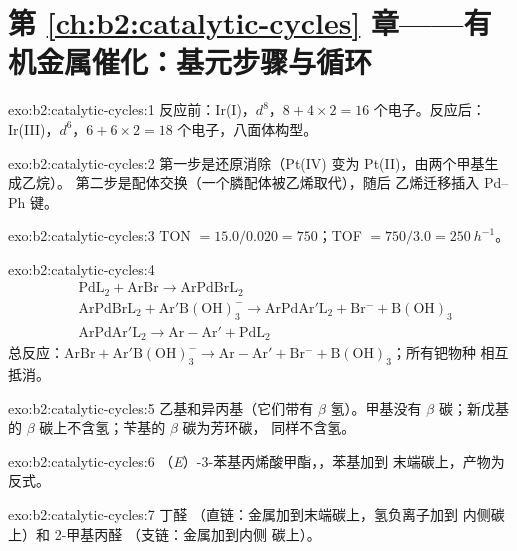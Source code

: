 \section*{第 \ref{ch:b2:catalytic-cycles} 章——有机金属催化：基元步骤与循环}

\begin{solution}{exo:b2:catalytic-cycles:1}
反应前：Ir(I)，$d^8$，$8 + 4 \times 2 = 16$ 个电子。反应后：Ir(III)，$d^6$，$6 + 6 \times 2 = 18$
个电子，八面体构型。
\end{solution}

\begin{solution}{exo:b2:catalytic-cycles:2}
第一步是还原消除（Pt(IV) 变为 Pt(II)，由两个甲基生成乙烷）。
第二步是配体交换（一个膦配体被乙烯取代），随后
乙烯迁移插入 Pd--Ph 键。
\end{solution}

\begin{solution}{exo:b2:catalytic-cycles:3}
TON $= 15.0/0.020 = 750$；TOF $= 750/3.0 = \qty{250}{h^{-1}}$。
\end{solution}

\begin{solution}{exo:b2:catalytic-cycles:4}
\begin{align*}
  &\mathrm{PdL_2 + ArBr \to ArPdBrL_2}\\
  &\mathrm{ArPdBrL_2 + Ar'B(OH)_3^- \to ArPdAr'L_2 + Br^- + B(OH)_3}\\
  &\mathrm{ArPdAr'L_2 \to Ar{-}Ar' + PdL_2}
\end{align*}
总反应：$\mathrm{ArBr + Ar'B(OH)_3^- \to Ar{-}Ar' + Br^- + B(OH)_3}$；所有钯物种
相互抵消。
\end{solution}

\begin{solution}{exo:b2:catalytic-cycles:5}
乙基和异丙基（它们带有 $\beta$ 氢）。甲基没有 $\beta$ 碳；新戊基的 $\beta$
碳上不含氢；苄基的 $\beta$ 碳为芳环碳，
同样不含氢。
\end{solution}

\begin{solution}{exo:b2:catalytic-cycles:6}
（\textit{E}）-3-苯基丙烯酸甲酯，，苯基加到
末端碳上，产物为反式。
\end{solution}

\begin{solution}{exo:b2:catalytic-cycles:7}
丁醛 （直链：金属加到末端碳上，氢负离子加到
内侧碳上）和 2-甲基丙醛 （支链：金属加到内侧
碳上）。
\end{solution}

